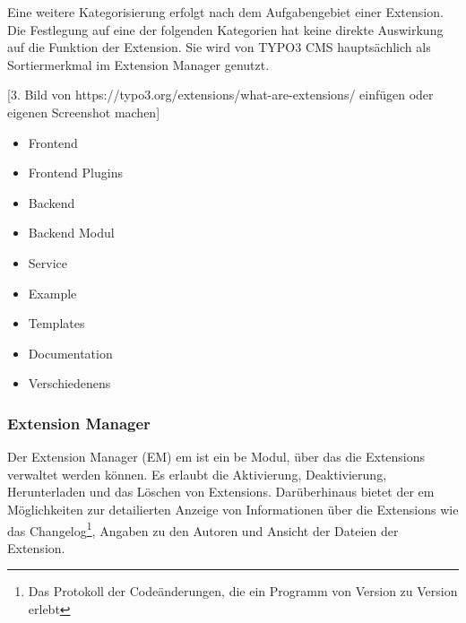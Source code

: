 Eine weitere Kategorisierung erfolgt nach dem Aufgabengebiet einer Extension. Die Festlegung auf eine der folgenden Kategorien hat keine direkte Auswirkung auf die Funktion der Extension. Sie wird von TYPO3 CMS hauptsächlich als Sortiermerkmal im Extension Manager genutzt.

[3. Bild von https://typo3.org/extensions/what-are-extensions/ einfügen oder eigenen Screenshot machen]

\begin{itemize}
	\item
		Frontend
	\item
		Frontend Plugins
	\item
		Backend
	\item
		Backend Modul
	\item
		Service
	\item
		Example
	\item
		Templates
	\item
		Documentation
	\item
		Verschiedenens
\end{itemize}

\subsubsection{Extension Manager}
Der Extension Manager (EM) \gls{em} ist ein \gls{be} Modul, über das die Extensions verwaltet werden können. Es erlaubt die Aktivierung, Deaktivierung, Herunterladen und das Löschen von Extensions. Darüberhinaus bietet der \gls{em} Möglichkeiten zur detailierten Anzeige von Informationen über die Extensions wie das Changelog\footnote{Das Protokoll der Codeänderungen, die ein Programm von Version zu Version erlebt}, Angaben zu den Autoren und Ansicht der Dateien der Extension.

